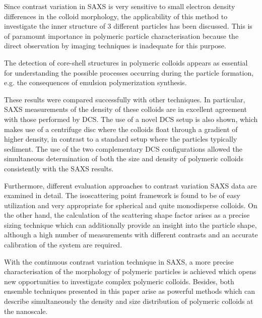 Since contrast variation in SAXS is very sensitive to small electron density differences in the colloid morphology, the applicability of this method to investigate the inner structure of 3 different particles has been discussed. This is of paramount importance in polymeric particle characterisation because the direct observation by imaging techniques is inadequate for this purpose.

The detection of core-shell structures in polymeric colloids appears as essential for understanding the possible processes occurring during the particle formation, e.g. the consequences of emulsion polymerization synthesis. 

These results were compared successfully with other techniques. In particular, SAXS measurements of the density of these colloids are in excellent agreement with those performed by DCS. The use of a novel DCS setup is also shown, which makes use of a centrifuge disc where the colloids float through a gradient of higher density, in contrast to a standard setup where the particles typically sediment. The use of the two complementary DCS configurations allowed the simultaneous determination of both the size and density of polymeric colloids consistently with the SAXS results.

Furthermore, different evaluation approaches to contrast variation SAXS data are examined in detail. The isoscattering point framework is found to be of easy utilization and very appropriate for spherical and quite monodisperse colloids. On the other hand, the calculation of the scattering shape factor arises as a precise sizing technique which can additionally provide an insight into the particle shape, although a high number of measurements with different contrasts and an accurate calibration of the system are required.

With the continuous contrast variation technique in SAXS, a more precise characterisation of the morphology of polymeric particles is achieved which opens new opportunities to investigate complex polymeric colloids. Besides, both ensemble techniques presented in this paper arise as powerful methods which can describe simultaneously the density and size distribution of polymeric colloids at the nanoscale.
